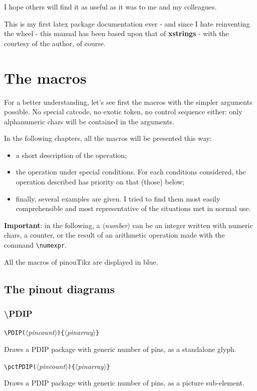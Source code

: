 \documentclass[english,a4paper,10pt]{article}
\newcommand\argu[1]{$\langle$\textit{#1}$\rangle$}
\newcommand\ARGU[1]{\texttt{\{}\argu{#1}\texttt{\}}}
\newcommand\arguD[1]{\texttt{(}\argu{#1}\texttt{)}}
\newcommand\pinouTikz{\textsf{pinouTikz}\xspace}
\newcommand\verbinline{\lstinline[basicstyle=\normalsize\ttfamily]}
\begin{document}
I hope others will find it as useful as it was to me and my colleagues.

This is my first latex package documentation ever - and since I hate reinventing the wheel - this manual has been based upon that of \textbf{xstrings} - with the courtesy of the author, of course.

\section{The macros}
For a better understanding, let's see first the macros with the simpler arguments possible. No special catcode, no exotic token, no control sequence either: only alphanumeric chars will be contained in the arguments.\medskip

In the following chapters, all the macros will be presented this way:
\begin{itemize}
	\item a short description of the operation;
	\item the operation under special conditions. For each conditions considered, the operation described has priority on that (those) below;
	\item finally, several examples are given. I tried to find them most easily comprehensible and most representative of the situations met in normal use.
\end{itemize}\smallskip

\textbf{Important}: in the following, a \argu{number} can be an integer written with numeric chars, a counter, or the result of an arithmetic operation made with the command \verbinline|\numexpr|.\smallskip

All the macros of \pinouTikz are displayed in {\makeatletter\color{@xs@keywordspinouTikz}blue}.

\subsection{The pinout diagrams}
\subsubsection{\ttfamily\textbackslash PDIP}
\verbinline|\PDIP|\arguD{pincount}\ARGU{pinarray}
\smallskip

Draws a PDIP package with generic number of pins, as a standalone glyph.

\verbinline|\pctPDIP|\arguD{pincount}\ARGU{pinarray}
\smallskip

Draws a PDIP package with generic number of pins, as a picture sub-element.
\end{document}
